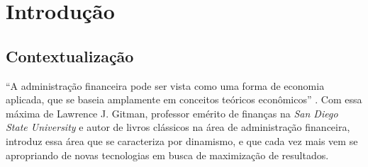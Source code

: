
\chapter{Introdução}
\label{chap_introducao}
\section{Contextualização}
\label{sec_contextualizacao}

``A administração financeira pode ser vista como uma forma de economia aplicada, que se baseia amplamente em conceitos teóricos econômicos'' . Com essa máxima de Lawrence J. Gitman, professor emérito de finanças  na \textit{San Diego State University} e autor de livros clássicos na área de administração financeira, introduz essa área que se caracteriza por dinamismo, e que cada vez mais vem se apropriando de novas tecnologias em busca de maximização de resultados.

